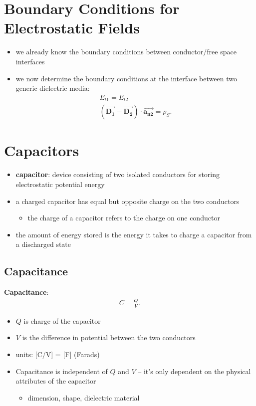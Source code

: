 \documentclass[10pt]{article}
\begin{document}
\section{Boundary Conditions for Electrostatic Fields}
\begin{itemize}
    \item we already know the boundary conditions between conductor/free space interfaces
    \item we now determine the boundary conditions at the interface between two generic dielectric media:
        \begin{gather*}
            E_{t1} = E_{t2} \\ 
            (\bm{\vec{D_1} } - \bm{\vec{D_2} }) \cdot \bm{\vec{a_{n2}}} = \rho_S
        .\end{gather*}
\end{itemize}




\section{Capacitors}
\begin{itemize}
    \item \textbf{capacitor}: device consisting of two isolated conductors for storing electrostatic potential energy
    \item a charged capacitor has equal but opposite charge on the two conductors
        \begin{itemize}
            \item the charge of a capacitor refers to the charge on one conductor
        \end{itemize}
    \item the amount of energy stored is the energy it takes to charge a capacitor from a discharged state
\end{itemize}

\subsection{Capacitance}
\begin{definition}
    \textbf{Capacitance}:
    \begin{gather*}
        C = \frac{Q}{V}
    .\end{gather*}
    \begin{itemize}
        \item $Q$ is charge of the capacitor
        \item $V$ is the difference in potential between the two conductors
        \item units: [C/V] = [F] (Farads)
    \end{itemize}
\end{definition}
\begin{itemize}
    \item Capacitance is independent of $Q$ and $V$ -- it's only dependent on the physical attributes of the capacitor
        \begin{itemize}
            \item dimension, shape, dielectric material
        \end{itemize}
\end{itemize}
\end{document}
